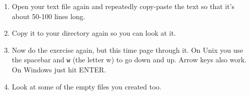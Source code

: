 \begin{enumerate}
\item Open your text file again and repeatedly copy-paste the text so that it's about 50-100 lines long.
\item Copy it to your  directory again so you can look at it.
\item Now do the exercise again, but this time page through it.  On Unix you use
    the spacebar and \verb|w| (the letter w) to go down and up.  Arrow keys also work. On Windows just hit ENTER.
\item Look at some of the empty files you created too.
\end{enumerate}

